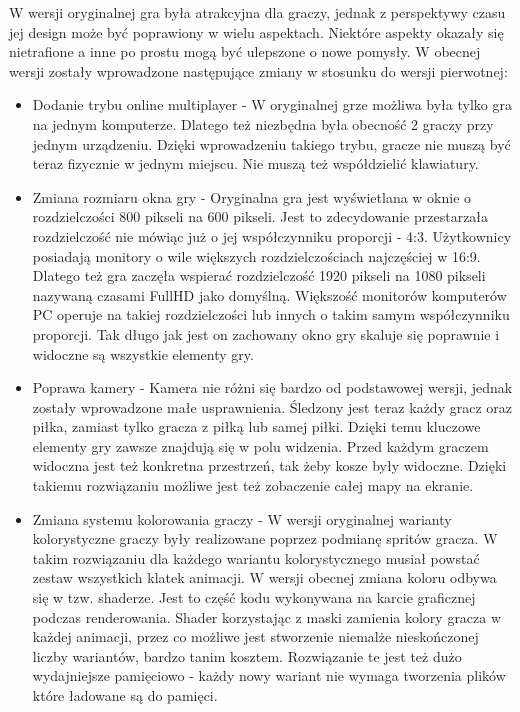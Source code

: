 \documentclass[a4paper,12pt,twoside,openany]{report}
\begin{document}
W wersji oryginalnej gra była atrakcyjna dla graczy, jednak z perspektywy czasu jej design może być poprawiony w wielu aspektach. Niektóre aspekty okazały się nietrafione a inne po prostu mogą być ulepszone o nowe pomysły. W obecnej wersji zostały wprowadzone następujące zmiany w stosunku do wersji pierwotnej:
\begin{itemize}
    \item Dodanie trybu online multiplayer - W oryginalnej grze możliwa była tylko gra na jednym komputerze. Dlatego też niezbędna była obecność 2 graczy przy jednym urządzeniu. Dzięki wprowadzeniu takiego trybu, gracze nie muszą być teraz fizycznie w jednym miejscu. Nie muszą też współdzielić klawiatury.
    \item Zmiana rozmiaru okna gry - Oryginalna gra jest wyświetlana w oknie o rozdzielczości 800 pikseli na 600 pikseli. Jest to zdecydowanie przestarzała rozdzielczość nie mówiąc już o jej współczynniku proporcji - 4:3. Użytkownicy posiadają monitory o wile większych rozdzielczościach najczęściej w 16:9. Dlatego też gra zaczęła wspierać rozdzielczość 1920 pikseli na 1080 pikseli nazywaną czasami FullHD jako domyślną. Większość monitorów komputerów PC operuje na takiej rozdzielczości lub innych o takim samym współczynniku proporcji. Tak długo jak jest on zachowany okno gry skaluje się poprawnie i widoczne są wszystkie elementy gry.
    \item Poprawa kamery - Kamera nie różni się bardzo od podstawowej wersji, jednak zostały wprowadzone małe usprawnienia. Śledzony jest teraz każdy gracz oraz piłka, zamiast tylko gracza z piłką lub samej piłki. Dzięki temu kluczowe elementy gry zawsze znajdują się w polu widzenia. Przed każdym graczem widoczna jest też konkretna przestrzeń, tak żeby kosze były widoczne. Dzięki takiemu rozwiązaniu możliwe jest też zobaczenie całej mapy na ekranie.  
    \item Zmiana systemu kolorowania graczy - W wersji oryginalnej warianty kolorystyczne graczy były realizowane poprzez podmianę spritów gracza. W takim rozwiązaniu dla każdego wariantu kolorystycznego musiał powstać zestaw wszystkich klatek animacji. W wersji obecnej zmiana koloru odbywa się w tzw. shaderze. Jest to część kodu wykonywana na karcie graficznej podczas renderowania. Shader korzystając z maski zamienia kolory gracza w każdej animacji, przez co możliwe jest stworzenie niemalże nieskończonej liczby wariantów, bardzo tanim kosztem. Rozwiązanie te jest też dużo wydajniejsze pamięciowo - każdy nowy wariant nie wymaga tworzenia plików które ładowane są do pamięci.

\end{itemize}
\end{document}
